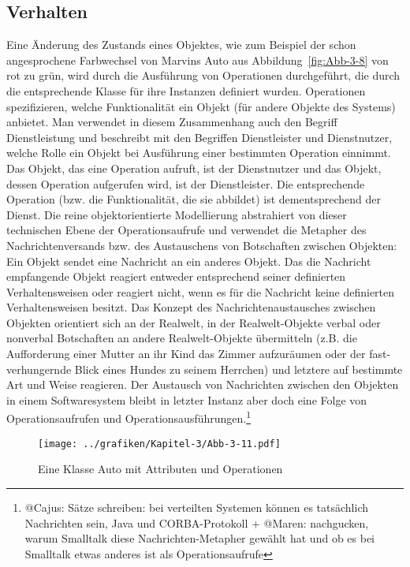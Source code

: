 \subsection{Verhalten}

Eine Änderung des Zustands eines Objektes, wie zum Beispiel der schon angesprochene Farbwechsel von Marvins Auto aus Abbildung~\ref{fig:Abb-3-8} von rot zu grün, wird durch die Ausführung von Operationen durchgeführt, die durch die entsprechende Klasse für ihre Instanzen definiert wurden. Operationen spezifizieren, welche Funktionalität ein Objekt (für andere Objekte des Systems) anbietet. Man verwendet in diesem Zusammenhang auch den Begriff Dienstleistung und beschreibt mit den Begriffen Dienstleister und Dienstnutzer, welche Rolle ein Objekt bei Ausführung einer bestimmten Operation einnimmt. Das Objekt, das eine Operation aufruft, ist der Dienstnutzer und das Objekt, dessen Operation aufgerufen wird, ist der Dienstleister. Die entsprechende Operation (bzw. die Funktionalität, die sie abbildet) ist dementsprechend der Dienst. Die reine objektorientierte Modellierung abstrahiert von dieser technischen Ebene der Operationsaufrufe und verwendet die Metapher des Nachrichtenversands bzw. des Austauschens von Botschaften zwischen Objekten: Ein Objekt sendet eine Nachricht an ein anderes Objekt. Das die Nachricht empfangende Objekt reagiert entweder entsprechend seiner definierten Verhaltensweisen oder reagiert nicht, wenn es für die Nachricht keine definierten Verhaltensweisen besitzt. Das Konzept des Nachrichtenaustausches zwischen Objekten orientiert sich an der Realwelt, in der Realwelt-Objekte verbal oder nonverbal Botschaften an andere Realwelt-Objekte übermitteln (z.B. die Aufforderung einer Mutter an ihr Kind das Zimmer aufzuräumen oder der fast-verhungernde Blick eines Hundes zu seinem Herrchen) und letztere auf bestimmte Art und Weise reagieren. Der Austausch von Nachrichten zwischen den Objekten in einem Softwaresystem bleibt in letzter Instanz aber doch eine Folge von Operationsaufrufen und Operationsausführungen.\footnote{@Cajus: Sätze schreiben: bei verteilten Systemen können es tatsächlich Nachrichten sein, Java und CORBA-Protokoll + @Maren: nachgucken, warum Smalltalk diese Nachrichten-Metapher gewählt hat und ob es bei Smalltalk etwas anderes ist als Operationsaufrufe} 
\begin{wrapfigure}{o}[70pt]{0.6\textwidth}
	\centering 
	\texttt{[image: ../grafiken/Kapitel-3/Abb-3-11.pdf]}
	\caption{Eine Klasse Auto mit Attributen und Operationen}
	\label{fig:Abb-3-11}
	\vspace{-6pt}
\end{wrapfigure}
